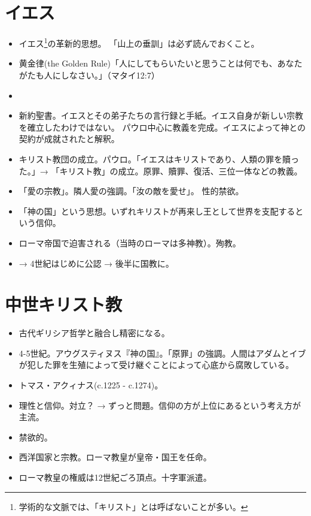 \documentclass[uplatex,dvipdfmx]{jsarticle} \usepackage{mystyle}%
\begin{document}
\section{イエス}


\begin{itemize}

\item イエス\footnote{学術的な文脈では、「キリスト」とは呼ばないことが多い。}の革新的思想。
「山上の垂訓」は必ず読んでおくこと。
\item 黄金律(the Golden Rule)「人にしてもらいたいと思うことは何でも、あなたがたも人にしなさい。」（マタイ12:7）
\item 
\item 新約聖書。イエスとその弟子たちの言行録と手紙。イエス自身が新しい宗教を確立したわけではない。
パウロ中心に教義を完成。イエスによって神との契約が成就されたと解釈。
\item キリスト教団の成立。パウロ。「イエスはキリストであり、人類の罪を贖った。」→ 「キリスト教」の成立。原罪、贖罪、復活、三位一体などの教義。
\item 「愛の宗教」。隣人愛の強調。「汝の敵を愛せ」。 性的禁欲。
\item 「神の国」という思想。いずれキリストが再来し王として世界を支配するという信仰。
\item ローマ帝国で迫害される（当時のローマは多神教）。殉教。
\item → 4世紀はじめに公認 → 後半に国教に。

\end{itemize}


\section{中世キリスト教}

\begin{itemize}
\item 古代ギリシア哲学と融合し精密になる。
\item 4-5世紀。アウグスティヌス『神の国』。「原罪」の強調。人間はアダムとイブが犯した罪を生殖によって受け継ぐことによって心底から腐敗している。
\item トマス・アクィナス(c.1225 - c.1274)。
\item 理性と信仰。対立？  → ずっと問題。信仰の方が上位にあるという考え方が主流。
\item 禁欲的。
\item 西洋国家と宗教。ローマ教皇が皇帝・国王を任命。
\item ローマ教皇の権威は12世紀ごろ頂点。十字軍派遣。
\end{itemize}
\end{document}
